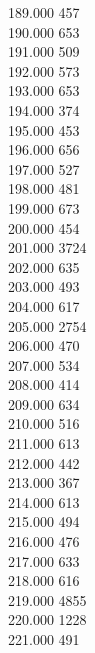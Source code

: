 { 189.000	457 \\
 190.000	653 \\
 191.000	509 \\
 192.000	573 \\
 193.000	653 \\
 194.000	374 \\
 195.000	453 \\
 196.000	656 \\
 197.000	527 \\
 198.000	481 \\
 199.000	673 \\
 200.000	454 \\
 201.000	3724 \\
 202.000	635 \\
 203.000	493 \\
 204.000	617 \\
 205.000	2754 \\
 206.000	470 \\
 207.000	534 \\
 208.000	414 \\
 209.000	634 \\
 210.000	516 \\
 211.000	613 \\
 212.000	442 \\
 213.000	367 \\
 214.000	613 \\
 215.000	494 \\
 216.000	476 \\
 217.000	633 \\
 218.000	616 \\
 219.000	4855 \\
 220.000	1228 \\
 221.000	491 \\
}
